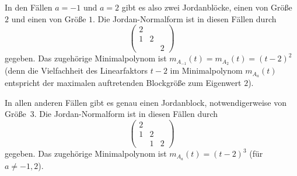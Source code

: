 \documentclass[a4paper, 10pt]{scrartcl}
\begin{document}
\begin{solution}
  In den Fällen $a = -1$ und $a = 2$ gibt es also zwei Jordanblöcke, einen von Größe $2$ und einen von Größe $1$.
  Die Jordan-Normalform ist in diesen Fällen durch
  \[
    \begin{pmatrix}
      2 &   &   \\
      1 & 2 &   \\
        &   & 2
    \end{pmatrix}
  \]
  gegeben.
  Das zugehörige Minimalpolynom ist $m_{A_{-1}}(t) = m_{A_2}(t) = (t-2)^2$ (denn die Vielfachheit des Linearfaktors $t-2$ im Minimalpolynom $m_{A_a}(t)$ entspricht der maximalen auftretenden Blockgröße zum Eigenwert $2$).
  
  In allen anderen Fällen gibt es genau einen Jordanblock, notwendigerweise von Größe~$3$.
  Die Jordan-Normalform ist in diesen Fällen durch
  \[
    \begin{pmatrix}
      2 &   &   \\
      1 & 2 &   \\
        & 1 & 2
    \end{pmatrix}
  \]
  gegeben.
  Das zugehörige Minimalpolynom ist $m_{A_a}(t) = (t-2)^3$ (für $a \neq -1, 2$).
\end{solution}
\end{document}
